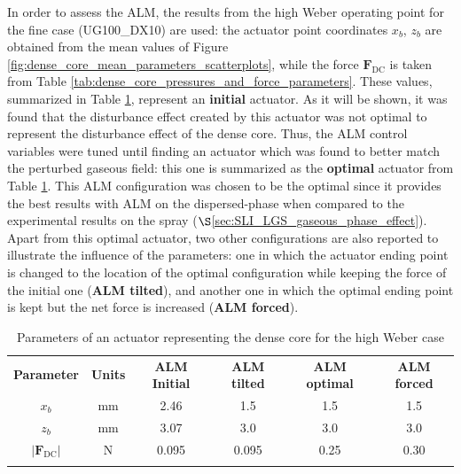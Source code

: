 In order to assess the ALM, the results from the high Weber operating point for the fine case (UG100\_DX10) are used: the actuator point coordinates $x_b$, $z_b$ are obtained from the mean values of Figure \ref{fig:dense_core_mean_parameters_scatterplots}, while the force $\textbf{F}_\mathrm{DC}$ is taken from Table \ref{tab:dense_core_pressures_and_force_parameters}. These values, summarized in Table \ref{tab:jicf_lgs_ALM_parameters}, represent an \textbf{initial} actuator. As it will be shown, it was found that the disturbance effect created by this actuator was not optimal to represent the disturbance effect of the dense core. Thus, the ALM control variables were tuned until finding an actuator which was found to better match the perturbed gaseous field: this one is summarized as the \textbf{optimal} actuator from Table \ref{tab:jicf_lgs_ALM_parameters}. This ALM configuration was chosen to be the optimal since it provides the best results with ALM on the dispersed-phase when compared to the experimental results on the spray ($\S$\ref{sec:SLI_LGS_gaseous_phase_effect}). Apart from this optimal actuator, two other configurations are also reported to illustrate the influence of the parameters: one in which the actuator ending point is changed to the location of the optimal configuration while keeping the force of the initial one (\textbf{ALM tilted}), and another one in which the optimal ending point is kept but the net force is increased (\textbf{ALM forced}). 


\begin{table}[!h]
\centering
\caption{Parameters of an actuator representing the dense core for the high Weber case}
\begin{tabular}{cccccc}
\thickhline
\textbf{Parameter} & \textbf{Units} &  \textbf{ALM Initial} & \textbf{ALM tilted} &  \textbf{ALM optimal} & \textbf{ALM forced} \\
\thickhline
$x_b$ & mm & 2.46 & 1.5 & 1.5 & 1.5 \\
$z_b$ & mm & 3.07 & 3.0 & 3.0 & 3.0 \\
$| \textbf{F}_\mathrm{DC} |$ & N & 0.095 & 0.095 & 0.25 & 0.30 \\
\thickhline
\end{tabular}
\label{tab:jicf_lgs_ALM_parameters}
\end{table}


